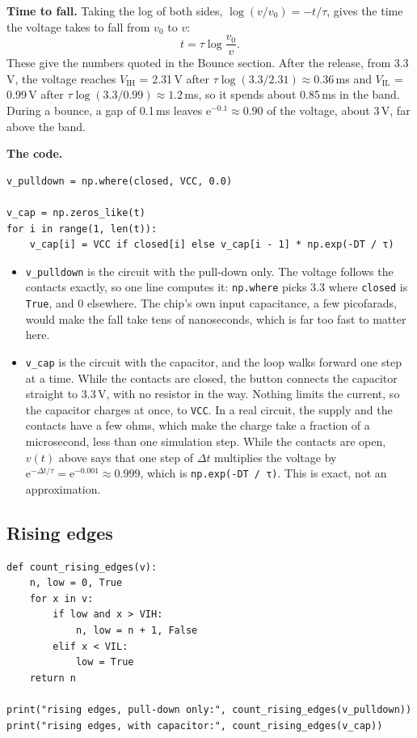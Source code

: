\documentclass[11pt,a4paper]{article}
\begin{document}
\textbf{Time to fall.} Taking the log of both sides, $\log(v/v_0) = -t/\tau$, gives the time the voltage takes to fall from $v_0$ to $v$:
\[ t = \tau \log\frac{v_0}{v}. \tag*{[s]} \]
These give the numbers quoted in the Bounce section. After the release, from 3.3\,V, the voltage reaches $V_\mathrm{IH}$ = 2.31\,V after $\tau \log(3.3/2.31) \approx 0.36$\,ms and $V_\mathrm{IL}$ = 0.99\,V after $\tau \log(3.3/0.99) \approx 1.2$\,ms, so it spends about 0.85\,ms in the band. During a bounce, a gap of 0.1\,ms leaves $\mathrm{e}^{-0.1} \approx 0.90$ of the voltage, about 3\,V, far above the band.

\textbf{The code.}

\begin{verbatim}
v_pulldown = np.where(closed, VCC, 0.0)

v_cap = np.zeros_like(t)
for i in range(1, len(t)):
    v_cap[i] = VCC if closed[i] else v_cap[i - 1] * np.exp(-DT / τ)
\end{verbatim}

\begin{itemize}
  \item \texttt{v\_pulldown} is the circuit with the pull-down only. The voltage follows the contacts exactly, so one line computes it: \texttt{np.where} picks 3.3 where \texttt{closed} is \texttt{True}, and 0 elsewhere. The chip’s own input capacitance, a few picofarads, would make the fall take tens of nanoseconds, which is far too fast to matter here.
  \item \texttt{v\_cap} is the circuit with the capacitor, and the loop walks forward one step at a time. While the contacts are closed, the button connects the capacitor straight to 3.3\,V, with no resistor in the way. Nothing limits the current, so the capacitor charges at once, to \texttt{VCC}. In a real circuit, the supply and the contacts have a few ohms, which make the charge take a fraction of a microsecond, less than one simulation step. While the contacts are open, $v(t)$ above says that one step of $\Delta t$ multiplies the voltage by $\mathrm{e}^{-\Delta t/\tau} = \mathrm{e}^{-0.001} \approx 0.999$, which is \texttt{np.exp(-DT / τ)}. This is exact, not an approximation.
\end{itemize}

\subsection*{Rising edges}

\begin{verbatim}
def count_rising_edges(v):
    n, low = 0, True
    for x in v:
        if low and x > VIH:
            n, low = n + 1, False
        elif x < VIL:
            low = True
    return n

print("rising edges, pull-down only:", count_rising_edges(v_pulldown))
print("rising edges, with capacitor:", count_rising_edges(v_cap))
\end{verbatim}
\end{document}
